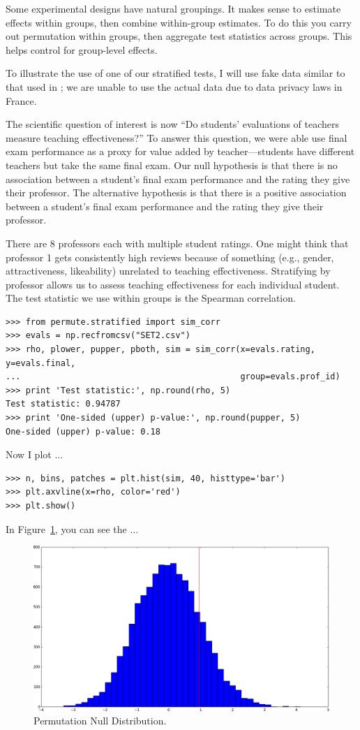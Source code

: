 Some experimental designs have natural groupings. It makes sense to estimate
effects within groups, then combine within-group estimates.  To do this you
carry out permutation within groups, then aggregate test statistics across
groups. This helps control for group-level effects.

To illustrate the use of one of our stratified tests, I will use fake
data similar to that used in \cite{boring2015}; we are unable to use
the actual data due to data privacy laws in France.

The scientific question of interest is now ``Do students' evaluations of
teachers measure teaching effectiveness?''  To answer this question, we were
able use final exam performance as a proxy for value added by
teacher---students have different teachers but take the same final exam.
Our null hypothesis is that there is no association between a student's final
exam performance and the rating they give their professor.  The alternative
hypothesis is that there is a positive association between a student's final
exam performance and the rating they give their professor.

There are 8 professors each with multiple student ratings.  One might think
that professor 1 gets consistently high reviews because of something (e.g.,
gender, attractiveness, likeability) unrelated to teaching effectiveness.
Stratifying by professor allows us to assess teaching effectiveness for each
individual student.  The test statistic we use within groups is the Spearman
correlation.

\begin{verbatim}
>>> from permute.stratified import sim_corr
>>> evals = np.recfromcsv("SET2.csv")
>>> rho, plower, pupper, pboth, sim = sim_corr(x=evals.rating, y=evals.final,
...                                            group=evals.prof_id)
>>> print 'Test statistic:', np.round(rho, 5)
Test statistic: 0.94787
>>> print 'One-sided (upper) p-value:', np.round(pupper, 5)
One-sided (upper) p-value: 0.18
\end{verbatim}

Now I plot ...

\begin{verbatim}
>>> n, bins, patches = plt.hist(sim, 40, histtype='bar')
>>> plt.axvline(x=rho, color='red')
>>> plt.show()
\end{verbatim}

In Figure~\ref{fig:figure2}, you can see the ...

\begin{figure}
  \begin{centering}
    \includegraphics[width=.8\textwidth]{fig/figure_2.png}\par
  \end{centering}

  \caption{\label{fig:figure2}Permutation Null Distribution.}

\end{figure}


